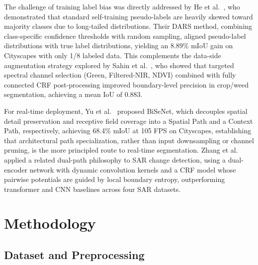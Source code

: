 \documentclass[conference]{IEEEtran}
\begin{document}
The challenge of training label bias was directly addressed by He et al.~\cite{he2021dars}, who demonstrated that
standard self-training pseudo-labels are heavily skewed toward majority classes due to long-tailed
distributions. Their DARS method, combining class-specific confidence thresholds with random
sampling, aligned pseudo-label distributions with true label distributions, yielding an 8.89\% mIoU gain
on Cityscapes with only 1/8 labeled data. This complements the data-side augmentation strategy explored
by Sahin et al.~\cite{sahin2023multispectral}, who showed that targeted spectral channel selection (Green, Filtered-NIR, NDVI)
combined with fully connected CRF post-processing improved boundary-level precision in crop/weed
segmentation, achieving a mean IoU of 0.883.

For real-time deployment, Yu et al.~\cite{yu2018bisenet} proposed BiSeNet, which decouples spatial detail preservation
and receptive field coverage into a Spatial Path and a Context Path, respectively, achieving 68.4\% mIoU
at 105 FPS on Cityscapes, establishing that architectural path specialization, rather than input downsampling or channel pruning, is the more principled route to real-time segmentation. Zhang et al.~\cite{zhang2023sar}
applied a related dual-path philosophy to SAR change detection, using a dual-encoder network with
dynamic convolution kernels and a CRF model whose pairwise potentials are guided by local boundary
entropy, outperforming transformer and CNN baselines across four SAR datasets.

 
\section{Methodology}\label{sec:method}

\subsection{Dataset and Preprocessing}\label{subsec:data}
\end{document}
